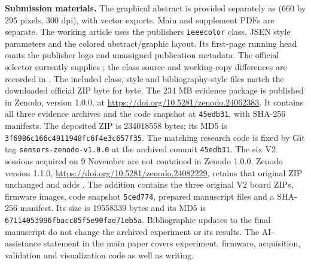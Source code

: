 \documentclass[10pt,letterpaper]{article}
\begin{document}
\textbf{Submission materials.} The graphical abstract is provided separately as  (660 by 295 pixels, 300 dpi), with vector exports. Main and supplement PDFs are separate. The working article uses the publisher\textquotesingle s \texttt{ieeecolor} class, JSEN style parameters and the colored abstract/graphic layout. Its first-page running head omits the publisher logo and unassigned publication metadata. The official selector currently supplies ; the class source and working-copy differences are recorded in . The included class, style and bibliography-style files match the downloaded official ZIP byte for byte. The 234 MB evidence package is published in Zenodo, version 1.0.0, at \url{https://doi.org/10.5281/zenodo.24062383}. It contains all three evidence archives and the code snapshot at \texttt{45edb31}, with SHA-256 manifests. The deposited ZIP is 234018558 bytes; its MD5 is \nolinkurl{3f6986c166c4911948fc6f4e3c657f35}. The matching research code is fixed by Git tag \texttt{sensors-zenodo-v1.0.0} at the archived commit \texttt{45edb31}. The six V2 sessions acquired on 9 November are not contained in Zenodo 1.0.0. Zenodo version 1.1.0, \url{https://doi.org/10.5281/zenodo.24082229}, retains that original ZIP unchanged and adds . The addition contains the three original V2 board ZIPs, firmware images, code snapshot \texttt{5ced774}, prepared manuscript files and a SHA-256 manifest. Its size is 19558339 bytes and its MD5 is \nolinkurl{67114053996fbacc05f5e90fae71eb5a}. Bibliographic updates to the final manuscript do not change the archived experiment or its results. The AI-assistance statement in the main paper covers experiment, firmware, acquisition, validation and visualization code as well as writing.
\end{document}
